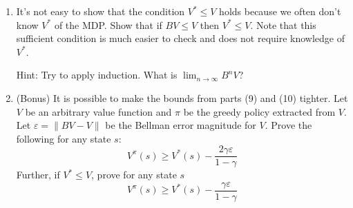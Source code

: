 \documentclass[12pt]{article}
\begin{document}
{{%

\begin{enumerate}[resume*]
    \item It’s not easy to show that the condition $V^{\ast} \leq V$ holds because we often don’t know $V^{\ast}$ of the MDP. Show that if $BV \leq V$ then $V^{\ast} \leq V$. Note that this sufficient condition is much easier
to check and does not require knowledge of $V^{\ast}$.

Hint: Try to apply induction. What is $\lim_{n \to \infty} B^nV$?
    
    \item (Bonus) It is possible to make the bounds from parts (9) and (10) tighter. Let $V$ be an arbitrary value function and $\pi$ be the greedy policy extracted from $V$. Let $\varepsilon = \|BV - V\|$ be the Bellman error magnitude for $V$. Prove the following for any state $s$:
    \[
    V^{\pi}(s) \geq V^{\ast}(s) - \frac{2\gamma \varepsilon}{1 - \gamma}
    \]
    Further, if $V^{\ast} \leq V$, prove for any state $s$
    \[
    V^{\pi}(s) \geq V^{\ast}(s) - \frac{\gamma \varepsilon}{1 - \gamma}
    \]
\end{enumerate}

\\









}}
\end{document}
